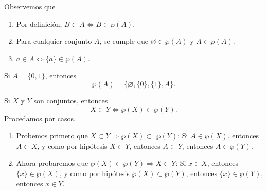 Observemos que
\begin{enumerate}
    \item Por definición, $B \subset A \Longleftrightarrow B \in \wp(A)$.
    \item Para cualquier conjunto $A$, se cumple que $\varnothing \in \wp(A)$ y $A \in \wp(A)$.
    \item $a \in A \Longleftrightarrow \{a\} \in \wp(A)$.
\end{enumerate}

\begin{examplebox}{}{}
    Si $A = \{0, 1\}$, entonces
    $$\wp(A) = \big\{\varnothing, \{0\}, \{1\}, A \big\}.$$
\end{examplebox}

\begin{theorem}{}{}
    Si $X$ y $Y$ son conjuntos, entonces
    $$X \subset Y \Longleftrightarrow \wp(X) \subset \wp(Y).$$
    \tcblower
    \demostracion Procedamos por casos.
    \begin{enumerate}[label=\roman*., topsep=6pt, itemsep=0pt]
        \item Probemos primero que $X \subset Y \Longrightarrow \wp(X) \subset$ $\wp(Y)$: Si $A \in \wp(X)$, entonces $A \subset X$, y como por hipótesis $X \subset Y$, entonces $A \subset Y$, entonces $A \in \wp(Y)$.
        \item Ahora probaremos que $\wp(X) \subset \wp(Y) \Longrightarrow X \subset Y$: Si $x \in X$, entonces $\{x\} \in \wp(X)$, y como por hipótesis $\wp(X) \subset \wp(Y)$, entonces $\{x\} \in \wp(Y)$, entonces $x \in Y$.
    \end{enumerate}
\end{theorem}